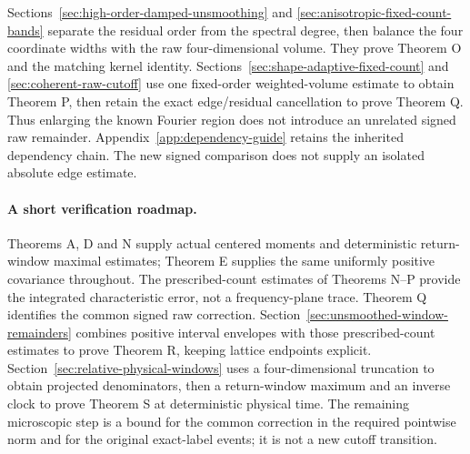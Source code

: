 \documentclass[11pt,reqno]{amsart}
\numberwithin{equation}{section}
\theoremstyle{definition}\newtheorem{definition}[theorem]{Definition}
\theoremstyle{remark}\newtheorem{remark}[theorem]{Remark}
\begin{document}
Sections~\ref{sec:high-order-damped-unsmoothing} and
\ref{sec:anisotropic-fixed-count-bands} separate the residual order from
the spectral degree, then balance the four coordinate widths with the
raw four-dimensional volume. They prove Theorem O and the matching
kernel identity. Sections~\ref{sec:shape-adaptive-fixed-count} and
\ref{sec:coherent-raw-cutoff} use one fixed-order weighted-volume
estimate to obtain Theorem P, then retain the exact edge/residual
cancellation to prove Theorem Q. Thus enlarging the known Fourier
region does not introduce an unrelated signed raw remainder.
Appendix~\ref{app:dependency-guide} retains the inherited dependency
chain. The new signed comparison does not supply an isolated
absolute edge estimate.

\paragraph{A short verification roadmap.}
Theorems A, D and N supply actual centered moments and deterministic
return-window maximal estimates; Theorem E supplies the same uniformly
positive covariance throughout. The prescribed-count estimates of
Theorems N--P provide the integrated characteristic error, not a
frequency-plane trace. Theorem Q identifies the common signed raw
correction. Section~\ref{sec:unsmoothed-window-remainders} combines
positive interval envelopes with those prescribed-count estimates to
prove Theorem R, keeping lattice endpoints explicit. Section~\ref{sec:relative-physical-windows}
uses a four-dimensional truncation to obtain projected denominators,
then a return-window maximum and an inverse clock to prove Theorem S
at deterministic physical time. The remaining microscopic step is a
bound for the common correction in the required pointwise norm and
for the original exact-label events; it is not a new cutoff transition.
\end{document}
